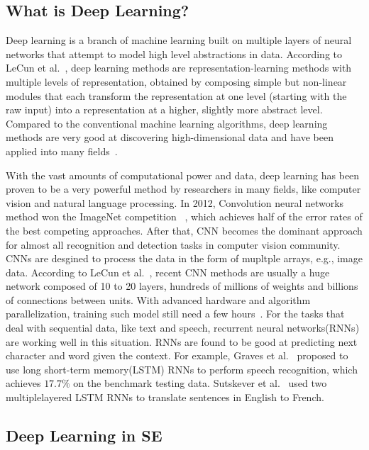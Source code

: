 \documentclass[sigconf,review, anonymous]{acmart}
\theoremstyle{break}
\begin{document}
\subsection{What is Deep Learning?}

Deep learning is a branch of machine learning built on multiple layers of neural networks that attempt to model high level abstractions in data. According to LeCun et al.~\cite{lecun2015deep}, deep learning methods are representation-learning methods with multiple levels of representation,
obtained by composing simple but non-linear modules that each
transform the representation at one level (starting with the raw input)
into a representation at a higher, slightly more abstract level. Compared to the conventional
machine learning algorithms, deep learning methods are very good at discovering high-dimensional data
and have been applied into many fields~\cite{schmidhuber2015deep,arel2010deep}.

With the vast amounts of computational power and data, 
deep learning has been proven to be a very powerful method 
by researchers in many fields\cite{lecun2015deep}, like computer vision and natural language processing\cite{krizhevsky2012imagenet,mikolov2013distributed,sutskever2014sequence}. In 2012, 
Convolution neural networks method won the ImageNet competition ~\cite{krizhevsky2012imagenet},
which achieves half of the error rates of the best competing
approaches. After that, CNN becomes the dominant approach for almost all recognition
and detection tasks in computer vision community. CNNs are desgined to process the data in the form of mupltple arrays, e.g., image data. According to LeCun et al.~\cite{lecun2015deep},
recent CNN methods are usually a huge network composed of 10 to 20 layers, hundreds of millions of weights and billions of connections between units. With advanced hardware and algorithm parallelization, training such model still need a few hours~\cite{lecun2015deep}. For the tasks that deal with sequential data, like text and speech, recurrent neural networks(RNNs) are working well in this situation. 
RNNs are found to be good at predicting next character and word given the context. For example, Graves et al.~\cite{graves2013speech} proposed to use long short-term memory(LSTM) RNNs to perform speech recognition, 
which achieves $17.7\%$ on the benchmark testing data. Sutskever et al.~\cite{sutskever2014sequence} used two multiplelayered LSTM RNNs to translate sentences in English to French.




\subsection{Deep Learning in SE}
\end{document}
